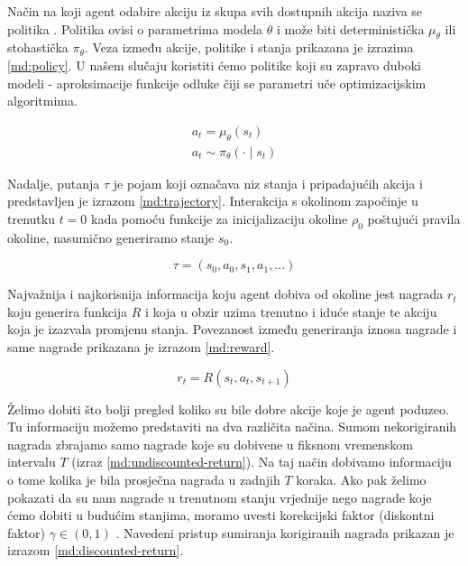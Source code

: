 Način na koji agent odabire akciju iz skupa svih dostupnih akcija naziva se politika . Politika ovisi o parametrima modela $\theta$ i može biti deterministička $\mu_{\theta}$ ili stohastička $\pi_{\theta}$. Veza između akcije, politike i stanja prikazana je izrazima \ref{md:policy}. U našem slučaju koristiti ćemo politike koji su zapravo duboki modeli - aproksimacije funkcije odluke čiji se parametri uče optimizacijskim algoritmima.  

\begin{equation}
    \begin{gathered}
    \label{md:policy}
    a_t = \mu_{\theta}(s_t) \\
    a_t \sim \pi_{\theta}(\cdot \mid s_t)
    \end{gathered}
\end{equation}

\bigskip

Nadalje, putanja $\tau$  je pojam koji označava niz stanja i pripadajućih akcija i predstavljen je izrazom \ref{md:trajectory}. Interakcija s okolinom započinje u trenutku $t = 0$ kada pomoću funkcije za inicijalizaciju okoline $\rho_0$ poštujući pravila okoline, nasumično generiramo stanje $s_0$.

\begin{equation}
    \label{md:trajectory}
    \tau = (s_0, a_0, s_1, a_1, ...)
\end{equation}

\bigskip

Najvažnija i najkorisnija informacija koju agent dobiva od okoline jest nagrada $r_t$  koju generira funkcija $R$  i koja u obzir uzima trenutno i iduće stanje te akciju koja je izazvala promjenu stanja. Povezanost između generiranja iznosa nagrade i same nagrade prikazana je izrazom \ref{md:reward}.

\begin{equation}
    \label{md:reward}
    r_t = R(s_t, a_t, s_{t+1})
\end{equation}

\bigskip

Želimo dobiti što bolji pregled koliko su bile dobre akcije koje je agent poduzeo. Tu informaciju možemo predstaviti na dva različita načina. Sumom nekorigiranih nagrada zbrajamo samo nagrade koje su dobivene u fiksnom vremenskom intervalu $T$ (izraz \ref{md:undiscounted-return}). Na taj način dobivamo informaciju o tome kolika je bila prosječna nagrada u zadnjih $T$ koraka. Ako pak želimo pokazati da su nam nagrade u trenutnom stanju vrjednije nego nagrade koje ćemo dobiti u budućim stanjima, moramo uvesti korekcijski faktor (diskontni faktor) $\gamma \in (0,1)$ . Navedeni pristup sumiranja korigiranih nagrada prikazan je izrazom \ref{md:discounted-return}.

